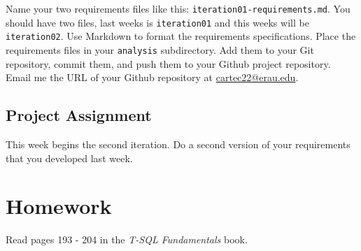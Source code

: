 \documentclass{article}
\begin{document}
        Name your two requirements files like this: \texttt{iteration01-requirements.md}. You should have two files, last weeks is \texttt{iteration01} and this weeks will be \texttt{iteration02}. Use Markdown to format the requirements specifications. Place the requirements files in your \texttt{analysis} subdirectory. Add them to your Git repository, commit them, and push them to your Github project repository. Email me the URL of your Github repository at \url{cartec22@erau.edu}.

        \subsection{Project Assignment}

        This week begins the second iteration. Do a second version of your requirements that you developed last week.

    \section{Homework}

        Read pages 193 - 204 in the \textit{T-SQL Fundamentals} book.
\end{document}
